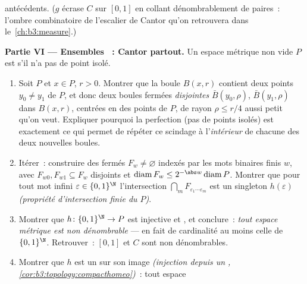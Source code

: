 \begin{problem}
\begin{enumerate}[resume]
        antécédents. ($g$ écrase $C$ sur $[0,1]$ en collant
        dénombrablement de paires~: l'ombre combinatoire de
        l'escalier de Cantor qu'on retrouvera dans
        le~\cref{ch:b3:measure}.)
\end{enumerate}
\medskip
\noindent\textbf{Partie VI --- Ensembles  ~:
Cantor partout.} Un espace métrique  non vide $P$ est
\emph{} s'il n'a pas de point isolé.
\begin{enumerate}[resume]
  \item Soit $P$   et $x \in P$, $r > 0$.
        Montrer que la boule $B(x, r)$ contient deux points
        $y_0 \neq y_1$ de $P$, et donc deux boules fermées
        \emph{disjointes} $\bar B(y_0, \rho)$, $\bar B(y_1,
        \rho)$ dans $B(x, r)$, centrées en des points de $P$,
        de rayon $\rho \leq r/4$ aussi petit qu'on veut.
        Expliquer pourquoi la perfection (pas de points
        isolés) est exactement ce qui permet de répéter ce
        scindage à l'\emph{intérieur} de chacune des deux
        nouvelles boules.
  \item Itérer~: construire des fermés $F_w \neq \varnothing$
        indexés par les mots binaires finis $w$, avec $F_{w0},
        F_{w1} \subseteq F_w$ disjoints et
        $\operatorname{diam}F_w \leq 2^{-\abs w}
        \operatorname{diam}P$. Montrer que pour tout mot
        infini $\varepsilon \in \{0,1\}^\N$ l'intersection
        $\bigcap_mF_{\varepsilon_1\cdots\varepsilon_m}$ est un
        singleton $h(\varepsilon)$ \emph{(propriété
        d'intersection finie du  $P$)}.
  \item Montrer que $h\colon\{0,1\}^\N \to P$ est injective et
        , et conclure~: \emph{tout espace métrique
          est non dénombrable} --- en fait de
        cardinalité au moins celle de $\{0,1\}^\N$.
        Retrouver~: $[0,1]$ et $C$ sont non dénombrables.
  \item Montrer que $h$ est un  sur son image
        \emph{(injection  depuis un ,
        \cref{cor:b3:topology:compacthomeo})}~: tout espace

\end{enumerate}
\end{problem}
